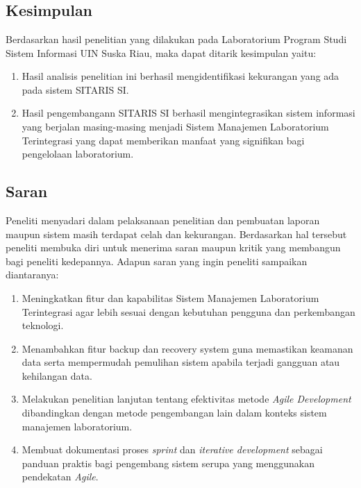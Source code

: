 %
%
%
%


\chapter{\babEnam}
\section{Kesimpulan}
Berdasarkan hasil penelitian yang dilakukan pada Laboratorium Program Studi Sistem Informasi UIN Suska Riau, maka dapat ditarik kesimpulan yaitu:

\begin{enumerate}
	\item Hasil analisis penelitian ini berhasil mengidentifikasi kekurangan yang ada pada sistem SITARIS SI.
	\item Hasil pengembangann SITARIS SI berhasil mengintegrasikan sistem informasi yang berjalan masing-masing menjadi Sistem Manajemen Laboratorium Terintegrasi yang dapat memberikan manfaat yang signifikan bagi pengelolaan laboratorium.
\end{enumerate}

\section{Saran}
Peneliti menyadari dalam pelaksanaan penelitian dan pembuatan laporan maupun sistem masih terdapat celah dan kekurangan. Berdasarkan hal tersebut peneliti membuka diri untuk menerima saran maupun kritik yang membangun bagi peneliti kedepannya. Adapun saran yang ingin peneliti sampaikan diantaranya:

\begin{enumerate}
	\item Meningkatkan fitur dan kapabilitas Sistem Manajemen Laboratorium Terintegrasi agar lebih sesuai dengan kebutuhan pengguna dan perkembangan teknologi.
	\item Menambahkan fitur backup dan recovery system guna memastikan keamanan data serta mempermudah pemulihan sistem apabila terjadi gangguan atau kehilangan data.
	\item Melakukan penelitian lanjutan tentang efektivitas metode \textit{Agile Development} dibandingkan dengan metode pengembangan lain dalam konteks sistem manajemen laboratorium.
	\item Membuat dokumentasi proses \textit{sprint} dan \textit{iterative development} sebagai panduan praktis bagi pengembang sistem serupa yang menggunakan pendekatan \textit{Agile}.
\end{enumerate}
